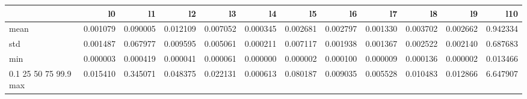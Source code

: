 \begin{tabular}{lrrrrrrrrrrr}
\toprule
 & l0 & l1 & l2 & l3 & l4 & l5 & l6 & l7 & l8 & l9 & l10 \\
\midrule
mean & 0.001079 & 0.090005 & 0.012109 & 0.007052 & 0.000345 & 0.002681 & 0.002797 & 0.001330 & 0.003702 & 0.002662 & 0.942334 \\
std & 0.001487 & 0.067977 & 0.009595 & 0.005061 & 0.000211 & 0.007117 & 0.001938 & 0.001367 & 0.002522 & 0.002140 & 0.687683 \\
min & 0.000003 & 0.000419 & 0.000041 & 0.000061 & 0.000000 & 0.000002 & 0.000100 & 0.000009 & 0.000136 & 0.000002 & 0.013466 \\
0.1%
25%
50%
75%
99.9%
max & 0.015410 & 0.345071 & 0.048375 & 0.022131 & 0.000613 & 0.080187 & 0.009035 & 0.005528 & 0.010483 & 0.012866 & 6.647907 \\
\bottomrule
\end{tabular}
